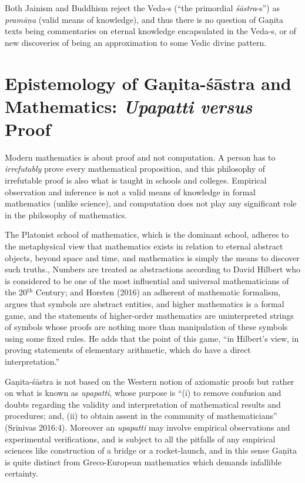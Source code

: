 Both Jainism and Buddhism reject the Veda-s (``the primordial {\sl śās\-tra}-s'') as {\sl pramāṇa} (valid means of knowledge), and thus there is no question of Gaṇita texts being commentaries on eternal knowledge encapsulated in the Veda-s, or of new discoveries of being an approximation to some Vedic divine pattern.

\section*{Epistemology of Gaṇita-śāstra and Mathematics: {\sl\bfseries Upapatti versus} Proof}

Modern mathematics is about proof and not computation. A person has to {\sl irrefutably} prove every mathematical proposition, and this philosophy of irrefutable proof is also what is taught in schools and colleges. Empirical observation and inference is not a valid means of knowledge in formal mathematics (unlike science), and computation does not play any significant role in the philosophy of mathematics. 

The Platonist school of mathematics, which is the dominant school, adheres to the metaphysical view that mathematics exists in relation to eternal abstract objects, beyond space and time, and mathematics is simply the means to discover such truths., Numbers are treated as abstractions according to David Hilbert who is considered to be one of the most influential and universal mathematicians of the 20$^{\text{th}}$ Century; and Horsten (2016) an adherent of mathematic formalism, argues that symbols are abstract entities, and higher mathematics is a formal game, and the statements of higher-order mathematics are uninterpreted strings of symbols whose proofs are nothing more than manipulation of these symbols using some fixed rules. He adds that the point of this game, “in Hilbert's view, in proving statements of elementary arithmetic, which do have a direct interpretation.”

Gaṇita-śāstra is not based on the Western notion of axiomatic proofs but rather on what is known as {\sl upapatti}, whose purpose is ``(i) to remove confusion and doubts regarding the validity and interpretation of mathematical results and procedures; and, (ii) to obtain assent in the community of mathematicians'' (Srinivas 2016:4). Moreover an {\sl upapatti} may involve empirical observations and experimental verifications, and is subject to all the pitfalls of any empirical sciences like construction of a bridge or a rocket-launch, and in this sense Gaṇita is quite distinct from Greco-European mathematics which demands infallible certainty.

